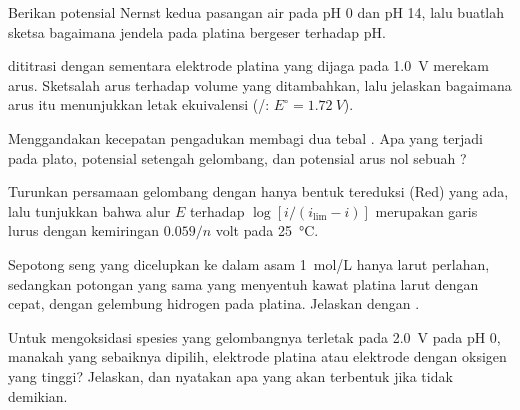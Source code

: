 \begin{exercise}[$\star\star$]\label{exo:b2:current-potential-curves:7}
Berikan potensial Nernst kedua pasangan air pada pH 0 dan pH 14, lalu
buatlah sketsa bagaimana jendela pada platina bergeser terhadap pH.
\end{exercise}

\begin{exercise}[$\star\star$]\label{exo:b2:current-potential-curves:8}
 dititrasi dengan  sementara elektrode platina yang
dijaga pada \qty{1.0}{V} merekam arus. Sketsalah arus terhadap volume yang
ditambahkan, lalu jelaskan bagaimana arus itu menunjukkan letak ekuivalensi
(/: $E^\circ =
\qty{1.72}{V}$).
\end{exercise}

\begin{exercise}[$\star\star$]\label{exo:b2:current-potential-curves:9}
Menggandakan kecepatan pengadukan membagi dua tebal . Apa
yang terjadi pada plato, potensial setengah gelombang, dan potensial arus
nol sebuah ?
\end{exercise}

\begin{exercise}[$\star\star\star$]\label{exo:b2:current-potential-curves:10}
Turunkan persamaan gelombang  dengan hanya bentuk tereduksi
(Red) yang ada, lalu
tunjukkan bahwa alur $E$ terhadap $\log[i/(i_{\lim} - i)]$ merupakan garis
lurus dengan kemiringan $0.059/n$ volt pada \qty{25}{\degreeCelsius}.
\end{exercise}

\begin{exercise}[$\star\star\star$]\label{exo:b2:current-potential-curves:11}
Sepotong seng yang dicelupkan ke dalam asam \qty{1}{mol/L} hanya larut
perlahan, sedangkan potongan yang sama yang menyentuh kawat platina larut
dengan cepat, dengan gelembung hidrogen pada platina. Jelaskan dengan
.
\end{exercise}

\begin{exercise}[$\star\star\star$]\label{exo:b2:current-potential-curves:12}
Untuk mengoksidasi spesies yang gelombangnya terletak pada \qty{2.0}{V}
pada pH 0, manakah yang sebaiknya dipilih, elektrode platina atau elektrode
dengan  oksigen yang tinggi? Jelaskan, dan nyatakan apa yang
akan terbentuk jika tidak demikian.
\end{exercise}

